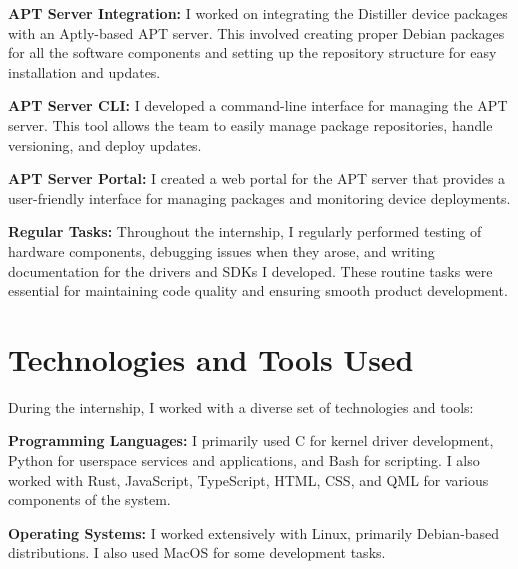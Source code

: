 \documentclass[12pt,a4paper]{report}
\begin{document}
\vspace{0.3cm}

\textbf{APT Server Integration:} I worked on integrating the Distiller device packages with an Aptly-based APT server. This involved creating proper Debian packages for all the software components and setting up the repository structure for easy installation and updates.

\vspace{0.3cm}

\textbf{APT Server CLI:} I developed a command-line interface for managing the APT server. This tool allows the team to easily manage package repositories, handle versioning, and deploy updates.

\vspace{0.3cm}

\textbf{APT Server Portal:} I created a web portal for the APT server that provides a user-friendly interface for managing packages and monitoring device deployments.

\vspace{0.3cm}

\textbf{Regular Tasks:} Throughout the internship, I regularly performed testing of hardware components, debugging issues when they arose, and writing documentation for the drivers and SDKs I developed. These routine tasks were essential for maintaining code quality and ensuring smooth product development.

\section{Technologies and Tools Used}

During the internship, I worked with a diverse set of technologies and tools:

\vspace{0.3cm}

\textbf{Programming Languages:} I primarily used C for kernel driver development, Python for userspace services and applications, and Bash for scripting. I also worked with Rust, JavaScript, TypeScript, HTML, CSS, and QML for various components of the system.

\vspace{0.3cm}

\textbf{Operating Systems:} I worked extensively with Linux, primarily Debian-based distributions. I also used MacOS for some development tasks.

\vspace{0.3cm}
\end{document}
